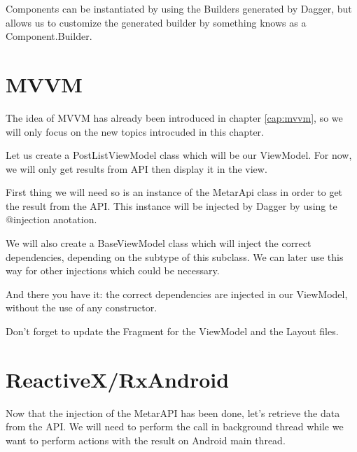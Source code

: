 Components can be instantiated by using the Builders generated by Dagger, but  allows us to customize the generated builder by something knows as a Component.Builder. 




\section{MVVM}
The idea of MVVM has already been introduced in chapter \ref{cap:mvvm}, so we will only focus on the new topics introcuded in this chapter. 

Let us create a PostListViewModel class which will be our ViewModel. For now, we will only get results from API then display it in the view.

First thing we will need so is an instance of the MetarApi class in order to get the result from the API. This instance will be injected by Dagger by using te @injection anotation.




We will also create a BaseViewModel class which will inject the correct dependencies, depending on the subtype of this subclass. We can later use this way for other injections which could be necessary.





And there you have it: the correct dependencies are injected in our ViewModel, without the use of any constructor. 

Don't forget to update the Fragment for the ViewModel and the Layout files. 


\section{ReactiveX/RxAndroid}
Now that the injection of the MetarAPI has been done, let’s retrieve the data from the API. We will need to perform the call in background thread while we want to perform actions with the result on Android main thread. 

